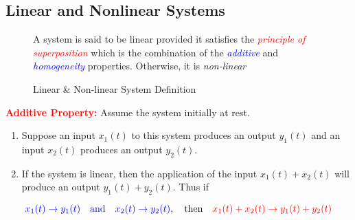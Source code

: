 \documentclass[../notes-main.tex]{subfiles}
\begin{document}
\subsection{Linear and Nonlinear Systems}
\begin{figure}[H]
    \centering
    \begin{mdframed}
        \begin{center}
            A system is said to be linear provided it satisfies the \textcolor{red}{\emph{principle of superposition}} which is the combination of the \textcolor{blue}{\emph{additive}} and \textcolor{blue}{\emph{homogeneity}} properties. Otherwise, it is \emph{non-linear}
        \end{center}
    \end{mdframed}\label{fig:linear-nonlinear-system-def-1}
    \vspace{-1em}\caption{Linear \& Non-linear System Definition}
\end{figure}
\noindent \textcolor{red}{\textbf{Additive Property:}} Assume the system initially at rest.
\begin{enumerate}[label=\blacktriangleright, leftmargin=*, itemsep=0.5em]
    \item Suppose an input \(x_1(t)\) to this system produces an output \(y_1(t)\) and an input \(x_2(t)\) produces an output \(y_2(t)\).
    \item If the system is linear, then the application of the input \(x_1(t) + x_2(t)\) will produce an output \(y_1(t) + y_2(t)\). Thus if
\end{enumerate}
\[
    \textcolor{blue}{x_1(t) \rightarrow y_1(t) \quad \text{and} \quad x_2(t) \rightarrow y_2(t)}, \quad \text{then} \quad \textcolor{red}{x_1(t) + x_2(t) \rightarrow y_1(t) + y_2(t)}
\]
\end{document}
